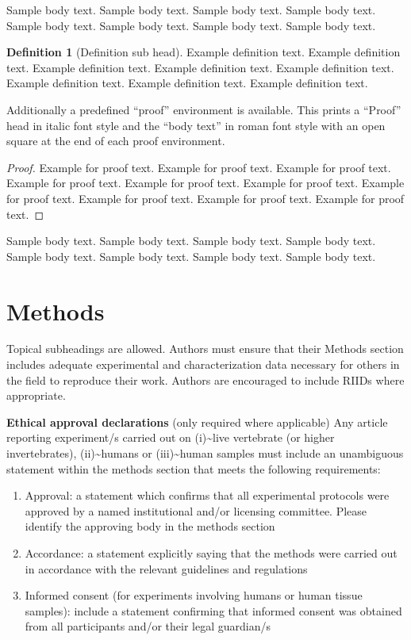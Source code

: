 \documentclass[sn-basic,lineno,pdflatex]{sn-jnl}
\theoremstyle{remark}
\theoremstyle{definition}
\newtheorem{definition}{Definition}%
\begin{document}
Sample body text. Sample body text. Sample body text. Sample body text.
Sample body text. Sample body text. Sample body text. Sample body text.

\begin{definition}[Definition sub head]
Example definition text. Example definition text. Example definition
text. Example definition text. Example definition text. Example
definition text. Example definition text. Example definition text.

\end{definition}

Additionally a predefined ``proof'' environment is available. This
prints a ``Proof'' head in italic font style and the ``body text'' in
roman font style with an open square at the end of each proof
environment.

\begin{proof}
Example for proof text. Example for proof text. Example for proof text.
Example for proof text. Example for proof text. Example for proof text.
Example for proof text. Example for proof text. Example for proof text.
Example for proof text.

\end{proof}

Sample body text. Sample body text. Sample body text. Sample body text.
Sample body text. Sample body text. Sample body text. Sample body text.

\section{Methods}\label{sec11}

Topical subheadings are allowed. Authors must ensure that their Methods
section includes adequate experimental and characterization data
necessary for others in the field to reproduce their work. Authors are
encouraged to include RIIDs where appropriate.

\textbf{Ethical approval declarations} (only required where applicable)
Any article reporting experiment/s carried out on
(i)\textasciitilde live vertebrate (or higher invertebrates),
(ii)\textasciitilde humans or (iii)\textasciitilde human samples must
include an unambiguous statement within the methods section that meets
the following requirements:

\begin{enumerate}
\def\labelenumi{\arabic{enumi}.}
\item
  Approval: a statement which confirms that all experimental protocols
  were approved by a named institutional and/or licensing committee.
  Please identify the approving body in the methods section
\item
  Accordance: a statement explicitly saying that the methods were
  carried out in accordance with the relevant guidelines and regulations
\item
  Informed consent (for experiments involving humans or human tissue
  samples): include a statement confirming that informed consent was
  obtained from all participants and/or their legal guardian/s
\end{enumerate}
\end{document}
